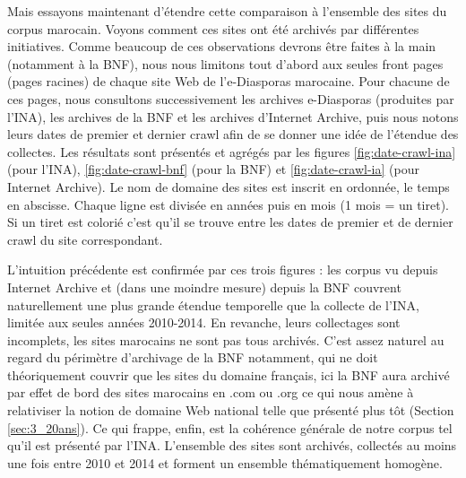 \documentclass[symmetric,justified,marginals=raggedouter]{tufte-book}
\begin{document}
\noindent Mais essayons maintenant d'étendre cette comparaison à l'ensemble des sites du corpus marocain. Voyons comment ces sites ont été archivés par différentes initiatives. Comme beaucoup de ces observations devrons être faites à la main (notamment à la BNF), nous nous limitons tout d'abord aux seules front pages (pages racines) de chaque site Web de l'e-Diasporas marocaine. Pour chacune de ces pages, nous consultons successivement les archives e-Diasporas (produites par l'INA), les archives de la BNF et les archives d'Internet Archive, puis nous notons leurs dates de premier et dernier crawl afin de se donner une idée de l'étendue des collectes. Les résultats sont présentés et agrégés par les figures \ref{fig:date-crawl-ina} (pour l'INA), \ref{fig:date-crawl-bnf} (pour la BNF) et \ref{fig:date-crawl-ia} (pour Internet Archive). Le nom de domaine des sites est inscrit en ordonnée, le temps en abscisse. Chaque ligne est divisée en années puis en mois (1 mois = un tiret). Si un tiret est colorié c'est qu'il se trouve entre les dates de premier et de dernier crawl du site correspondant.

\iffalse

\begin{figure*}[hbtp]%
  \texttt{[image: graphics/date-crawl-ina]}
  \caption{Préservation des sites de l'e-Diaspora marocaine par l'INA}
  \label{fig:date-crawl-ina}
\end{figure*}

\begin{figure*}[hbtp]%
  \texttt{[image: graphics/date-crawl-bnf]}
  \caption{Préservation des sites de l'e-Diaspora marocaine par la BNF}
  \label{fig:date-crawl-bnf}
\end{figure*}

\begin{figure*}[hbtp]%
  \texttt{[image: graphics/date-crawl-ia]}
  \caption{Préservation des sites de l'e-Diaspora marocaine par Internet Archive}
  \label{fig:date-crawl-ia}
\end{figure*}

\fi

L'intuition précédente est confirmée par ces trois figures : les corpus vu depuis Internet Archive et (dans une moindre mesure) depuis la BNF couvrent naturellement une plus grande étendue temporelle que la collecte de l'INA, limitée aux seules années 2010-2014. En revanche, leurs collectages sont incomplets, les sites marocains ne sont pas tous archivés. C'est assez naturel au regard du périmètre d'archivage de la BNF notamment, qui ne doit théoriquement couvrir que les sites du domaine français, ici la BNF aura archivé par effet de bord des sites marocains en .com ou .org ce qui nous amène à relativiser la notion de domaine Web national telle que présenté plus tôt (Section \ref{sec:3_20ans}). Ce qui frappe, enfin, est la cohérence générale de notre corpus tel qu'il est présenté par l'INA. L'ensemble des sites sont archivés, collectés au moins une fois entre 2010 et 2014 et forment un ensemble thématiquement homogène. 
\end{document}
